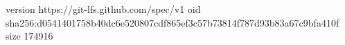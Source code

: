 version https://git-lfs.github.com/spec/v1
oid sha256:d0541401758b40dc6e520807cdf865ef3c57b73814f787d93b83a67c9bfa410f
size 174916
